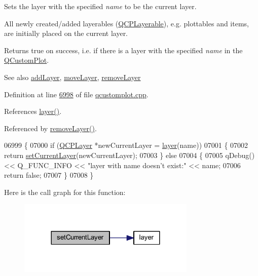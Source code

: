 Sets the layer with the specified {\itshape name} to be the current layer. 

All newly created/added layerables (\hyperlink{a00044}{Q\+C\+P\+Layerable}), e.\+g. plottables and items, are initially placed on the current layer.

Returns true on success, i.\+e. if there is a layer with the specified {\itshape name} in the \hyperlink{a00030_d8/d00/a00186}{Q\+Custom\+Plot}.

\begin{DoxySeeAlso}{See also}
\hyperlink{a00116_acfae623ec58e4f9e35014062580e4720}{add\+Layer}, \hyperlink{a00116_ad18d1ff9086f2e658b81d67d3c84a0c3}{move\+Layer}, \hyperlink{a00116_a40f75e342c5eaab6a86066a42a0e2a94}{remove\+Layer} 
\end{DoxySeeAlso}


Definition at line \hyperlink{a00115_source_l06998}{6998} of file \hyperlink{a00115_source}{qcustomplot.\+cpp}.



References \hyperlink{a00116_ae576ada60c1133318e29348d43d3cf10}{layer()}.



Referenced by \hyperlink{a00115_source_l07087}{remove\+Layer()}.


\begin{DoxyCode}
06999 \{
07000   \textcolor{keywordflow}{if} (\hyperlink{a00043}{QCPLayer} *newCurrentLayer = \hyperlink{a00116_ae576ada60c1133318e29348d43d3cf10}{layer}(name))
07001   \{
07002     \textcolor{keywordflow}{return} \hyperlink{a00116_a73a6dc47c653bb6f8f030abca5a11852}{setCurrentLayer}(newCurrentLayer);
07003   \} \textcolor{keywordflow}{else}
07004   \{
07005     qDebug() << Q\_FUNC\_INFO << \textcolor{stringliteral}{"layer with name doesn't exist:"} << name;
07006     \textcolor{keywordflow}{return} \textcolor{keyword}{false};
07007   \}
07008 \}
\end{DoxyCode}


Here is the call graph for this function\+:
\nopagebreak
\begin{figure}[H]
\begin{center}
\leavevmode
\includegraphics[width=240pt]{d4/d3e/a00116_a73a6dc47c653bb6f8f030abca5a11852_cgraph}
\end{center}
\end{figure}




